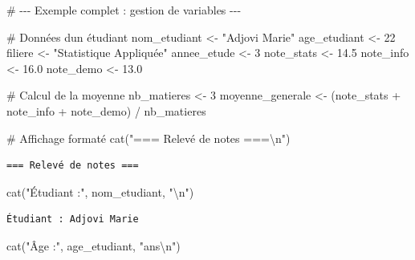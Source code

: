 \documentclass[
  french,
  11pt,
  a4paper,
]{article}
\newenvironment{Shaded}{}{}
\newcommand{\CommentTok}[1]{\textcolor[rgb]{0.42,0.45,0.49}{#1}}
\newcommand{\DecValTok}[1]{\textcolor[rgb]{0.00,0.36,0.77}{#1}}
\newcommand{\FloatTok}[1]{\textcolor[rgb]{0.00,0.36,0.77}{#1}}
\newcommand{\FunctionTok}[1]{\textcolor[rgb]{0.44,0.26,0.76}{#1}}
\newcommand{\NormalTok}[1]{\textcolor[rgb]{0.14,0.16,0.18}{#1}}
\newcommand{\OtherTok}[1]{\textcolor[rgb]{0.44,0.26,0.76}{#1}}
\newcommand{\SpecialCharTok}[1]{\textcolor[rgb]{0.00,0.36,0.77}{#1}}
\newcommand{\StringTok}[1]{\textcolor[rgb]{0.01,0.18,0.38}{#1}}
\begin{document}
\begin{Shaded}
\begin{Highlighting}[]
\CommentTok{\# {-}{-}{-} Exemple complet : gestion de variables {-}{-}{-}}

\CommentTok{\# Données d\textquotesingle{}un étudiant}
\NormalTok{nom\_etudiant }\OtherTok{\textless{}{-}} \StringTok{"Adjovi Marie"}
\NormalTok{age\_etudiant }\OtherTok{\textless{}{-}} \DecValTok{22}
\NormalTok{filiere }\OtherTok{\textless{}{-}} \StringTok{"Statistique Appliquée"}
\NormalTok{annee\_etude }\OtherTok{\textless{}{-}} \DecValTok{3}
\NormalTok{note\_stats }\OtherTok{\textless{}{-}} \FloatTok{14.5}
\NormalTok{note\_info }\OtherTok{\textless{}{-}} \FloatTok{16.0}
\NormalTok{note\_demo }\OtherTok{\textless{}{-}} \FloatTok{13.0}

\CommentTok{\# Calcul de la moyenne}
\NormalTok{nb\_matieres }\OtherTok{\textless{}{-}} \DecValTok{3}
\NormalTok{moyenne\_generale }\OtherTok{\textless{}{-}}\NormalTok{ (note\_stats }\SpecialCharTok{+}\NormalTok{ note\_info }\SpecialCharTok{+}\NormalTok{ note\_demo) }\SpecialCharTok{/}\NormalTok{ nb\_matieres}

\CommentTok{\# Affichage formaté}
\FunctionTok{cat}\NormalTok{(}\StringTok{"=== Relevé de notes ===}\SpecialCharTok{\textbackslash{}n}\StringTok{"}\NormalTok{)}
\end{Highlighting}
\end{Shaded}

\begin{verbatim}
=== Relevé de notes ===
\end{verbatim}

\begin{Shaded}
\begin{Highlighting}[]
\FunctionTok{cat}\NormalTok{(}\StringTok{"Étudiant :"}\NormalTok{, nom\_etudiant, }\StringTok{"}\SpecialCharTok{\textbackslash{}n}\StringTok{"}\NormalTok{)}
\end{Highlighting}
\end{Shaded}

\begin{verbatim}
Étudiant : Adjovi Marie 
\end{verbatim}

\begin{Shaded}
\begin{Highlighting}[]
\FunctionTok{cat}\NormalTok{(}\StringTok{"Âge :"}\NormalTok{, age\_etudiant, }\StringTok{"ans}\SpecialCharTok{\textbackslash{}n}\StringTok{"}\NormalTok{)}
\end{Highlighting}
\end{Shaded}
\end{document}
